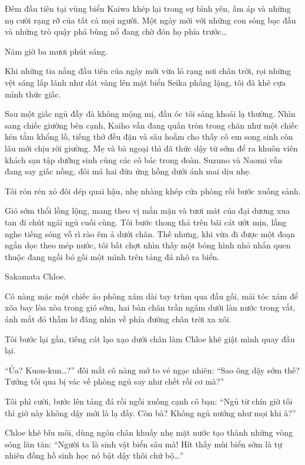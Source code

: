 \documentclass[../main.tex]{subfiles}
\begin{document}
Đêm đầu tiên tại vùng biển Kaiwa khép lại trong sự bình yên, ấm áp và những nụ cười rạng rỡ của tất cả mọi người. Một ngày mới với những con sóng bạc đầu và những trò quậy phá bùng nổ đang chờ đón họ phía trước\dots

\ct


Năm giờ ba mươi phút sáng.

Khi những tia nắng đầu tiên của ngày mới vừa ló rạng nơi chân trời, rọi những vệt sáng lấp lánh như dát vàng lên mặt biển Seika phẳng lặng, tôi đã khẽ cựa mình thức giấc.

Sau một giấc ngủ đẫy đà không mộng mị, đầu óc tôi sảng khoái lạ thường. Nhìn sang chiếc giường bên cạnh, Kaiho vẫn đang quấn tròn trong chăn như một chiếc kén tằm khổng lồ, tiếng thở đều đặn và sâu hoắm cho thấy cô em song sinh còn lâu mới chịu rời giường. Mẹ và bà ngoại thì đã thức dậy từ sớm để ra khuôn viên khách sạn tập dưỡng sinh cùng các cô bác trong đoàn. Suzuno và Naomi vẫn đang say giấc nồng, đôi má hai đứa ửng hồng dưới ánh mai dịu nhẹ.

Tôi rón rén xỏ đôi dép quai hậu, nhẹ nhàng khép cửa phòng rồi bước xuống sảnh.

\ct

Gió sớm thổi lồng lộng, mang theo vị mằn mặn và tươi mát của đại dương xua tan đi chút ngái ngủ cuối cùng. Tôi bước thong thả trên bãi cát ướt mịn, lắng nghe tiếng sóng vỗ rì rào êm ả dưới chân. Thế nhưng, khi vừa đi được một đoạn ngắn dọc theo mép nước, tôi bất chợt nhìn thấy một bóng hình nhỏ nhắn quen thuộc đang ngồi bó gối một mình trên tảng đá nhô ra biển.

Sakamata Chloe.

Cô nàng mặc một chiếc áo phông xám dài tay trùm qua đầu gối, mái tóc xám để xõa bay lòa xòa trong gió sớm, hai bàn chân trần ngâm dưới làn nước trong vắt, ánh mắt đỏ thẫm lơ đãng nhìn về phía đường chân trời xa xôi.

Tôi bước lại gần, tiếng cát lạo xạo dưới chân làm Chloe khẽ giật mình quay đầu lại.

``Ủa? Kuon-kun\dots?'' đôi mắt cô nàng mở to vẻ ngạc nhiên: ``Sao ông dậy sớm thế? Tưởng tối qua bị vác về phòng ngủ say như chết rồi cơ mà?''

Tôi phì cười, bước lên tảng đá rồi ngồi xuống cạnh cô bạn: ``Ngủ từ chín giờ tối thì giờ này không dậy mới là lạ đấy. Còn bà? Không ngủ nướng như mọi khi à?''

Chloe khẽ bĩu môi, dùng ngón chân khuấy nhẹ mặt nước tạo thành những vòng sóng lăn tăn: ``Người ta là sinh vật biển sâu mà! Hít thấy mùi biển sớm là tự nhiên đồng hồ sinh học nó bật dậy thôi chứ bộ\dots''
\end{document}
